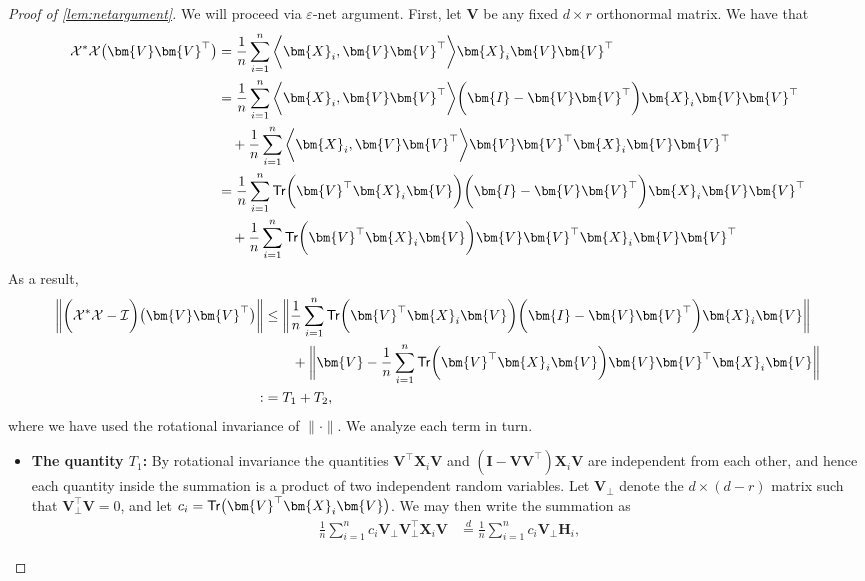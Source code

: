 \documentclass[10pt]{article}
\newcommand{\eps}{\ensuremath{\varepsilon}}
\newcommand{\s}{^*}
\renewcommand{\t}{^{\top}}
\theoremstyle{definition}
\begin{document}
\begin{proof}[Proof of \cref{lem:netargument}]
We will proceed via $\eps$-net argument.  First, let $\bm{V}$ be any fixed $d \times r$  orthonormal matrix.  We have that
\begin{align}
\mathcal{X}\s \mathcal{X} \big( \bm{V} \bm{V}\t \big) &= 
    \frac{1}{n} \sum_{i=1}^{n} \bigg \langle \bm{X}_i, \bm{V} \bm{V}\t \bigg\rangle\bm{X}_i \bm{V} \bm{V}\t  \\
    &= \frac{1}{n} \sum_{i=1}^{n} \bigg \langle \bm{X}_i, \bm{V} \bm{V}\t \bigg \rangle  \bigg( \bm{I} - \bm{V} \bm{V}\t \bigg) \bm{X}_i \bm{V} \bm{V}\t \\
    &\quad + \frac{1}{n} \sum_{i=1}^{n} \bigg \langle \bm{X}_i, \bm{V} \bm{V}\t \bigg \rangle   \bm{V} \bm{V}\t  \bm{X}_i \bm{V} \bm{V}\t \\
    &= \frac{1}{n} \sum_{i=1}^{n} {\sf Tr} \bigg( \bm{V}\t \bm{X}_i \bm{V} \bigg) \bigg( \bm{I} - \bm{V}\bm{V}\t \bigg) \bm{X}_i \bm{V} \bm{V}\t \\
    &\quad + \frac{1}{n} \sum_{i=1}^{n} {\sf Tr}  \bigg( \bm{V}\t \bm{X}_i \bm{V} \bigg)  \bm{V} \bm{V}\t \bm{X}_i \bm{V} \bm{V}\t
\end{align}
As a result,
\begin{align}
\bigg\|    \bigg( \mathcal{X}\s \mathcal{X} - \mathcal{I} \bigg) \big( \bm{V} \bm{V}\t \big) \bigg\| &\leq \bigg\| \frac{1}{n} \sum_{i=1}^{n} {\sf Tr} \bigg( \bm{V}\t \bm{X}_i \bm{V} \bigg) \bigg( \bm{I} - \bm{V} \bm{V}\t \bigg) \bm{X}_i \bm{V} \bigg\| \\
&\qquad +  \bigg\|\bm{V} -  \frac{1}{n} \sum_{i=1}^{n} {\sf Tr} \bigg( \bm{V}\t \bm{X}_i \bm{V} \bigg)\bm{V} \bm{V}\t \bm{X}_i \bm{V}  \bigg\| \\
:&= T_1 + T_2,
\end{align}
where we have used the rotational invariance of $\|\cdot\|$.  We analyze each term in turn. 
\begin{itemize}
    \item \textbf{The quantity $T_1$:}  By rotational invariance the quantities $\bm{V}\t \bm{X}_i \bm{V}$ and $(\bm{I - VV}\t) \bm{X}_i \bm{V } $ are  independent from each other, and hence each quantity inside the summation is a product of two independent random variables. Let $\bm{V}_{\perp}$ denote the $d \times (d-r) $ matrix such that $\bm{V}_{\perp}\t \bm{V} = 0$, and let $c_i = {\sf Tr}\big( \bm{V}\t \bm{X}_i \bm{V} \big)$.  We may then write the summation as
    \begin{align}
        \frac{1}{n} \sum_{i=1}^{n} c_i \bm{V}_{\perp } \bm{V}_{\perp}\t \bm{X}_i \bm{V} &\overset{d}{=} \frac{1}{n} \sum_{i=1}^{n} c_i \bm{V}_{\perp } \bm{H}_i,

\end{align}
\end{itemize}
\end{proof}
\end{document}
